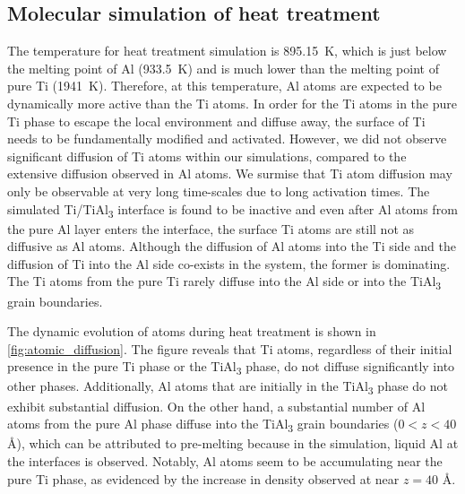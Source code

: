 \subsection{Molecular simulation of heat treatment}
\label{sec:md_results}
The temperature for heat treatment simulation is \SI{895.15}{\kelvin}, which is just below the melting point of Al (\SI{933.5}{\kelvin}) and is much lower than the melting point of pure Ti (\SI{1941}{\kelvin}). Therefore, at this temperature, Al atoms are expected to be dynamically more active than the Ti atoms. In order for the Ti atoms in the pure Ti phase to escape the local environment and diffuse away, the surface of Ti needs to be fundamentally modified and activated. However, we did not observe significant diffusion of Ti atoms within our simulations, compared to the extensive diffusion observed in Al atoms. We surmise that Ti atom diffusion may only be observable at very long time-scales due to long activation times. The simulated Ti/TiAl\textsubscript{3} interface is found to be inactive and even after Al atoms from the pure Al layer enters the interface, the surface Ti atoms are still not as diffusive as Al atoms. Although the diffusion of Al atoms into the Ti side and the diffusion of Ti into the Al side co-exists in the system, the former is dominating. The Ti atoms from the pure Ti rarely diffuse into the Al side or into the TiAl\textsubscript{3} grain boundaries. 

The dynamic evolution of atoms during heat treatment is shown in \cref{fig:atomic_diffusion}. The figure reveals that Ti atoms, regardless of their initial presence in the pure Ti phase or the TiAl\textsubscript{3} phase, do not diffuse significantly into other phases. Additionally, Al atoms that are initially in the TiAl\textsubscript{3} phase do not exhibit substantial diffusion. On the other hand, a substantial number of Al atoms from the pure Al phase diffuse into the TiAl\textsubscript{3} grain boundaries ($0 < z < 40$ \AA), which can be attributed to pre-melting because in the simulation, liquid Al at the interfaces is observed. Notably, Al atoms seem to be accumulating near the pure Ti phase, as evidenced by the increase in density observed at near $z = 40$ \AA.


